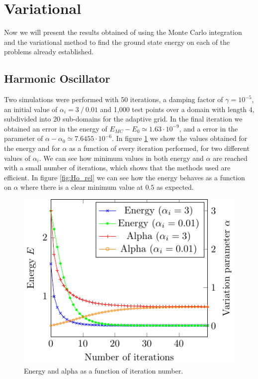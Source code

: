 
\section{Variational}
Now we will present the results obtained of using the Monte Carlo integration and the variational
method to find the ground state energy on each of the problems already established.

\subsection{Harmonic Oscillator}
Two simulations were performed with 50 iterations, a damping factor of $\gamma = 10^{-5}$,
an initial value of $\alpha_i = 3~/~ 0.01$  and 1,000 test points over a domain with length 4,
subdivided into 20 sub-domains for the adaptive grid. In the final iteration we obtained an
error in the energy of $E_{MC}-E_0 \simeq 1.63\cdot 10^{-9}$,
and a error in the parameter of $\alpha - \alpha_0 \simeq 7.6455\cdot 10^{-6}$. In figure \ref{fig:Ho_it}
we show the values obtained for the energy and for $\alpha$ as a function of every iteration performed,
for two different values of $\alpha_i$. We can see how  minimum values in both energy and $\alpha$ are
reached with a small number of iterations, which shows that the methods used are efficient. In figure
 \ref{fig:Ho_rel} we can see how the energy behaves as a function on $\alpha$ where there is a clear
minimum value at $0.5$ as expected.
\begin{figure}
	\begin{center}
		\includegraphics[scale=0.9]{graphs/ho-e-alpha-iterations.pdf}
		\caption{
			Energy and alpha as a function of iteration number. %
			}
		\label{fig:Ho_it}
	\end{center}
\end{figure}
